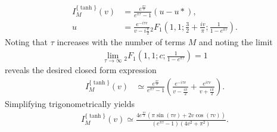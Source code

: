 \begin{align}
	I_M^{\{\tanh\}}(v) &= 
	\frac{e^{\frac{\pi\tau}{2}}}{e^{\pi\tau} - 1}\left(u - u*\right), \\
	u &= \frac{e^{-i\tau v}}{v - i\frac{\pi}{2}}
	     {}_{2}F_{1}\left(1, 1; \frac{3}{2} + \frac{iv}{\pi}; \frac{1}{1 - e^{\pi\tau}}\right).
\end{align}
Noting that $\tau$ increases with the number of terms $M$ and noting the limit
\begin{align}
	\lim_{\tau \to \infty} {}_{2}F_{1}\left(1, 1; c; \frac{1}{1-e^{\pi \tau}}\right) = 1
\end{align}
reveals the desired closed form expression
\begin{align}
	I_M^{\{\tanh\}}(v) &\simeq 
	\frac{e^{\frac{\pi\tau}{2}}}{e^{\pi\tau} - 1}\left(
	\frac{e^{-i\tau v}}{v - \frac{i\pi}{2}} + \frac{e^{i\tau v}}{v + \frac{i \pi}{2}}
	\right).
\end{align}
Simplifying trigonometrically yields
\begin{align}
	I_M^{\{\tanh\}}(v) \simeq
	\frac{
		4 e^{\frac{\pi \tau}{2}}
		\left(\pi \sin(\tau v) + 2 v \cos(\tau v)\right)
	}{(e^{\pi \tau} - 1)(4v^2 + \pi^2)}.
\end{align}

